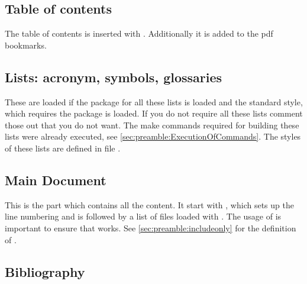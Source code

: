 \subsection{Table of contents}
\label{sec:document:toc}

The table of contents is inserted with . Additionally it is added to the pdf bookmarks.

\subsection{Lists: acronym, symbols, glossaries}
\label{sec:document:glossaries}

These are loaded if the package for all these lists is loaded and the standard 
style, which requires the  package is loaded. If you do 
not require all these lists comment those out that you do not want. The make 
commands required for building these lists were already executed, see 
\vref{sec:preamble:ExecutionOfCommands}. The styles of these lists are defined in file .

\subsection{Main Document}
\label{sec:document:content}

This is the part which contains all the content. It start with , which sets up the line numbering and is followed by a list of files loaded with . The usage of  is important to ensure that  works. See \cref{sec:preamble:includeonly} for the definition of .


\subsection{Bibliography}
\label{sec:document:bibliography}

